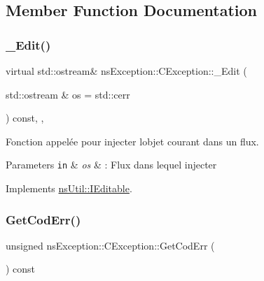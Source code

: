 \subsection{Member Function Documentation}
\mbox{\label{classns_exception_1_1_c_exception_a6416e24189687d875f3e92b10d6bd516}} 
\subsubsection{\texorpdfstring{\+\_\+\+Edit()}{\_Edit()}}
{\footnotesize\ttfamily virtual std\+::ostream\& ns\+Exception\+::\+C\+Exception\+::\+\_\+\+Edit (\begin{DoxyParamCaption}\item[{std\+::ostream \&}]{os = {\ttfamily std\+:\+:cerr} }\end{DoxyParamCaption}) const\hspace{0.3cm}{\ttfamily [override]}, {\ttfamily [protected]}, {\ttfamily [virtual]}}



Fonction appelée pour injecter l\textquotesingle{}objet courant dans un flux. 


\begin{DoxyParams}[1]{Parameters}
\mbox{\tt in}  & {\em os} & \+: Flux dans lequel injecter \\
\hline
\end{DoxyParams}


Implements \hyperlink{classns_util_1_1_i_editable_ab20bbe582b95383ed3f1453109035853}{ns\+Util\+::\+I\+Editable}.

\mbox{\label{classns_exception_1_1_c_exception_adf06d1598420c7b60c1b134bf2a946c2}} 
\subsubsection{\texorpdfstring{Get\+Cod\+Err()}{GetCodErr()}}
{\footnotesize\ttfamily unsigned ns\+Exception\+::\+C\+Exception\+::\+Get\+Cod\+Err (\begin{DoxyParamCaption}{ }\end{DoxyParamCaption}) const\hspace{0.3cm}{\ttfamily [inline]}}



